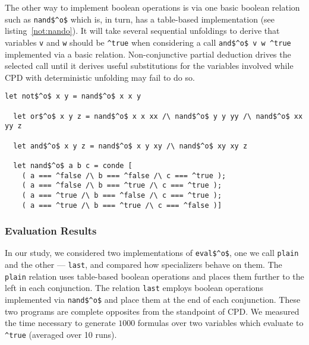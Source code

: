 The other way to implement boolean operations is via one basic boolean relation such as \lstinline{nand$^o$} which is, in turn, has a table-based implementation (see listing~\ref{not:nando}).
It will take several sequential unfoldings to derive that variables \lstinline{v} and \lstinline{w} should be \lstinline{^true} when considering a call \lstinline{and$^o$ v w ^true} implemented via a basic relation.
Non-conjunctive partial deduction drives the selected call until it derives useful substitutions for the variables involved while CPD with deterministic unfolding may fail to do so.

\begin{figure*}[!h]
  \centering
  \begin{minipage}{0.7\textwidth}
    \begin{lstlisting}[label={not:nando}, caption={Implementation of boolean operation via \lstinline{nand}}, captionpos=b, frame=tb]
  let not$^o$ x y = nand$^o$ x x y

  let or$^o$ x y z = nand$^o$ x x xx /\ nand$^o$ y y yy /\ nand$^o$ xx yy z

  let and$^o$ x y z = nand$^o$ x y xy /\ nand$^o$ xy xy z

  let nand$^o$ a b c = conde [
    ( a === ^false /\ b === ^false /\ c === ^true );
    ( a === ^false /\ b === ^true /\ c === ^true );
    ( a === ^true /\ b === ^false /\ c === ^true );
    ( a === ^true /\ b === ^true /\ c === ^false )]
    \end{lstlisting}
  \end{minipage}
\end{figure*}

\subsubsection{Evaluation Results}
In our study, we considered two implementations of \lstinline{eval$^o$}, one we call \lstinline{plain} and the other --- \lstinline{last}, and compared how specializers behave on them.
The \lstinline{plain} relation uses table-based boolean operations and places them further to the left in each conjunction.
The relation \lstinline{last} employs boolean operations implemented via \lstinline{nand$^o$} and place them at the end of each conjunction.
These two programs are complete opposites from the standpoint of CPD.
We measured the time necessary to generate $1000$ formulas over two variables which evaluate to \lstinline{^true} (averaged over 10 runs).


